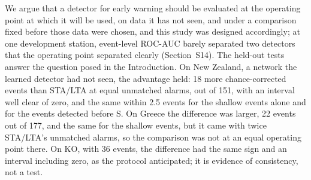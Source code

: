 \documentclass[a4paper,fleqn]{cas-sc}
\newcommand{\stalta}{STA/LTA}
\begin{document}
We argue that a detector for early warning should be evaluated at the operating
point at which it will be used, on data it has not seen, and under a comparison fixed
before those data were chosen, and this study was designed accordingly; at one
development station, event-level ROC-AUC barely separated two detectors that the
operating point separated clearly (Section~S14). The held-out tests answer the question posed in the
Introduction. On New Zealand, a network the learned detector had not seen, the advantage held: 18
more chance-corrected events than \stalta{} at equal unmatched alarms, out of 151,
with an interval well clear of zero, and the same within 2.5 events for the shallow
events alone and for the events detected before S. On Greece the difference was
larger, 22 events out of 177, and the same for the shallow events, but it came with
twice \stalta{}'s unmatched alarms, so the comparison was not at an equal operating
point there.
On KO, with 36 events, the difference had the same sign and an interval including
zero, as the protocol anticipated; it is evidence of consistency, not a test.
\end{document}
